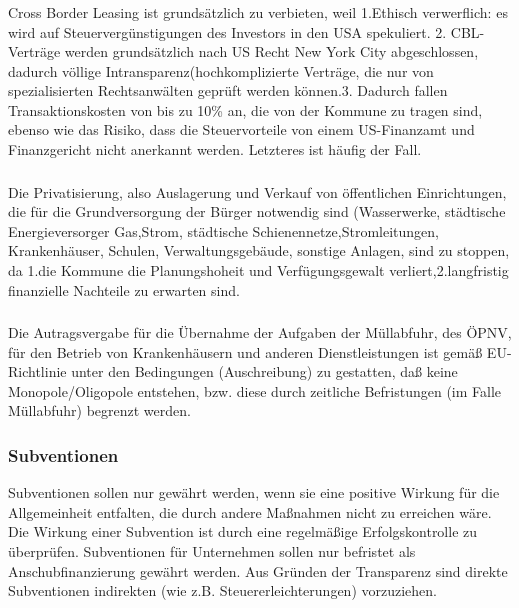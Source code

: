 \subsubsection{ }
\abstimmung
Cross Border Leasing ist grundsätzlich zu verbieten, weil 1.Ethisch verwerflich: es wird auf Steuervergünstigungen des Investors in den USA spekuliert. 2. CBL-Verträge werden grundsätzlich nach US Recht New York City abgeschlossen, dadurch völlige Intransparenz(hochkomplizierte Verträge, die nur von spezialisierten Rechtsanwälten geprüft werden können.3. Dadurch fallen Transaktionskosten von bis zu 10\% an, die von der Kommune zu tragen sind, ebenso wie das Risiko, dass die Steuervorteile von einem US-Finanzamt und Finanzgericht nicht anerkannt werden. Letzteres ist häufig der Fall.

\subsubsection{ }
\abstimmung
Die Privatisierung, also Auslagerung und Verkauf von öffentlichen Einrichtungen, die für die Grundversorgung der Bürger notwendig sind (Wasserwerke, städtische Energieversorger Gas,Strom, städtische Schienennetze,Stromleitungen, Krankenhäuser, Schulen, Verwaltungsgebäude, sonstige Anlagen, sind zu stoppen, da 1.die Kommune die Planungshoheit und Verfügungsgewalt verliert,2.langfristig finanzielle Nachteile zu erwarten sind.

\subsubsection{ }
\abstimmung
Die Autragsvergabe für die Übernahme der Aufgaben der Müllabfuhr, des ÖPNV, für den Betrieb von Krankenhäusern und anderen Dienstleistungen ist gemäß EU-Richtlinie unter den Bedingungen (Auschreibung) zu gestatten, daß keine Monopole/Oligopole entstehen, bzw. diese durch zeitliche Befristungen (im Falle Müllabfuhr) begrenzt werden.
 
\label{wp:wirt:wirt1}

\subsubsection{Subventionen}
Subventionen sollen nur gewährt werden, wenn sie eine positive Wirkung für die Allgemeinheit entfalten, die durch andere Maßnahmen nicht zu erreichen wäre. Die Wirkung einer Subvention ist durch eine regelmäßige Erfolgskontrolle zu überprüfen. Subventionen für Unternehmen sollen nur befristet als Anschubfinanzierung gewährt werden. Aus Gründen der Transparenz sind direkte Subventionen indirekten (wie z.B. Steuererleichterungen) vorzuziehen.
 
